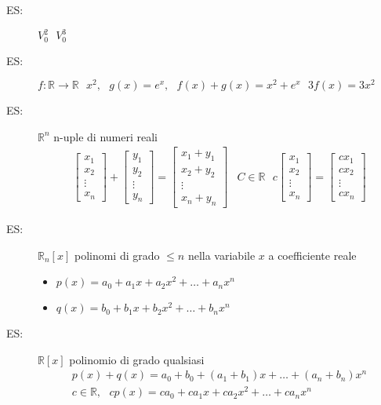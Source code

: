 \documentclass{book}
\begin{document}
\begin{description}
	\item[ES:] $V_0^2\text{ } V_0^3$
	\item[ES:] $f:\mathds{R}\to \mathds{R}\text{ } x^2, \text{ } g(x)=e^x, \text{ } f(x)+g(x)=x^2+e^x\text{ } 3f(x)=3x^2$
	\item[ES:] $\mathds{R}^n$ n-uple di numeri reali
	\[
	\begin{matrix}
		\begin{bmatrix}
			x_1\\
			x_2\\
			\vdots\\
			x_n
		\end{bmatrix}+\begin{bmatrix}
			y_1\\
			y_2\\
			\vdots\\
			y_n
		\end{bmatrix}=\begin{bmatrix}
			x_1+y_1\\
			x_2+y_2\\
			\vdots\\
			x_n+y_n
		\end{bmatrix}&C\in\mathds{R} \text{ } c\begin{bmatrix}
			x_1\\
			x_2\\
			\vdots\\
			x_n
		\end{bmatrix}=\begin{bmatrix}
			cx_1\\
			cx_2\\
			\vdots\\
			cx_n
		\end{bmatrix}
	\end{matrix}
	\]
	\item[ES:] $\mathds{R}_n[x]$ polinomi di grado $\leq n$ nella variabile $x$ a coefficiente reale
		\begin{itemize}
			\item $p(x)=a_0+a_1x+a_2x^2+\dots+a_nx^n$
			\item $q(x)=b_0+b_1x+b_2x^2+\dots+b_nx^n$
		\end{itemize}
	\item[ES:] $\mathds{R}[x]$ polinomio di grado qualsiasi
		\begin{equation*}
			\begin{matrix}
				p(x)+q(x)=a_0+b_0+(a_1+b_1)x+\dots+(a_n+b_n)x^n\\
				c\in\mathds{R},\text{ } cp(x)=ca_0+ca_1x+ca_2x^2+\dots+ca_nx^n
			\end{matrix}
		\end{equation*}
\end{description}
\end{document}

